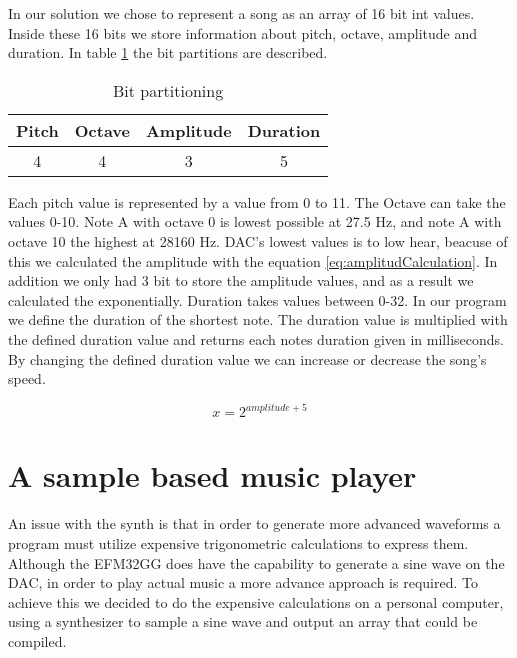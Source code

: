 In our solution we chose to represent a song as an array of 16 bit int values. Inside these 16 bits we store information about pitch, octave, amplitude and duration. In table \ref{tab:bitFields} the bit partitions are described.
\begin{table}[H]
	\begin{center}
	\begin{tabular}{ |c|c|c|c| }
	  \hline
	  Pitch & Octave & Amplitude & Duration \\
	  \hline
	  4 & 4 & 3 & 5 \\
	  \hline

	\end{tabular}
	\caption{Bit partitioning}
	\label{tab:bitFields}
	\end{center}
\end{table}

Each pitch value is represented by a value from 0 to 11. The Octave can take the values 0-10. Note A with octave 0 is lowest possible at 27.5 Hz, and note A with octave 10 the highest at 28160 Hz. DAC's lowest values is to low hear, beacuse of this we calculated the amplitude with the equation \ref{eq:amplitudCalculation}. In addition we only had 3 bit to store the amplitude values, and as a result we calculated the exponentially. Duration takes values between 0-32. In our program we define the duration of the shortest note. The duration value is multiplied with the defined duration value and returns each notes duration given in milliseconds. By changing the defined duration value we can increase or decrease the song's speed.

\begin{equation}
  x = 2^{amplitude + 5}
  \label{eq:amplitudCalculation}
\end{equation}


\section{A sample based music player}

An issue with the synth is that in order to generate more advanced waveforms a program must utilize expensive trigonometric calculations to express them. Although the EFM32GG does have the capability to generate a sine wave on the DAC, in order to play actual music a more advance approach is required. To achieve this we decided to do the expensive calculations on a personal computer, using a synthesizer to sample a sine wave and output an array that could be compiled. 

